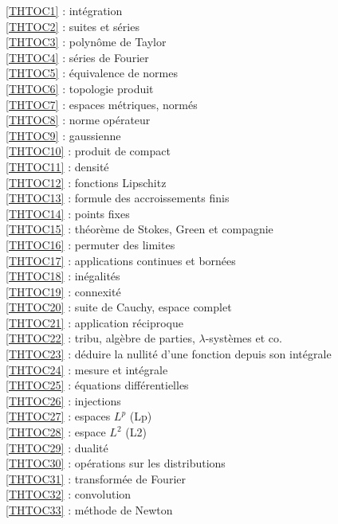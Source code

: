 \ref {THTOC1} : intégration\\
\ref {THTOC2} : suites et séries\\
\ref {THTOC3} : polynôme de Taylor\\
\ref {THTOC4} : séries de Fourier\\
\ref {THTOC5} : équivalence de normes\\
\ref {THTOC6} : topologie produit\\
\ref {THTOC7} : espaces métriques, normés\\
\ref {THTOC8} : norme opérateur\\
\ref {THTOC9} : gaussienne\\
\ref {THTOC10} : produit de compact\\
\ref {THTOC11} : densité\\
\ref {THTOC12} : fonctions Lipschitz\\
\ref {THTOC13} : formule des accroissements finis\\
\ref {THTOC14} : points fixes\\
\ref {THTOC15} : théorème de Stokes, Green et compagnie\\
\ref {THTOC16} : permuter des limites\\
\ref {THTOC17} : applications continues et bornées\\
\ref {THTOC18} : inégalités\\
\ref {THTOC19} : connexité\\
\ref {THTOC20} : suite de Cauchy, espace complet\\
\ref {THTOC21} : application réciproque\\
\ref {THTOC22} : tribu, algèbre de parties, \( \lambda \)-systèmes et co.\\
\ref {THTOC23} : déduire la nullité d'une fonction depuis son intégrale\\
\ref {THTOC24} : mesure et intégrale\\
\ref {THTOC25} : équations différentielles\\
\ref {THTOC26} : injections\\
\ref {THTOC27} : espaces \( L^p\) (Lp)\\
\ref {THTOC28} : espace \( L^2\) (L2)\\
\ref {THTOC29} : dualité\\
\ref {THTOC30} : opérations sur les distributions\\
\ref {THTOC31} : transformée de Fourier\\
\ref {THTOC32} : convolution\\
\ref {THTOC33} : méthode de Newton\\
